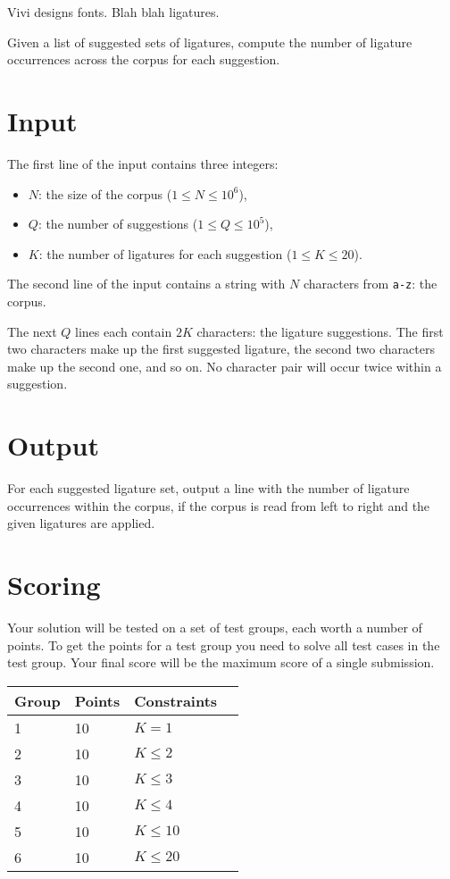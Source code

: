 Vivi designs fonts. Blah blah ligatures.

Given a list of suggested sets of ligatures, compute the number of ligature occurrences
across the corpus for each suggestion.

\section*{Input}
The first line of the input contains three integers:
\begin{itemize}
  \item $N$: the size of the corpus ($1 \le N \le 10^6$),
  \item $Q$: the number of suggestions ($1 \le Q \le 10^5$),
  \item $K$: the number of ligatures for each suggestion ($1 \le K \le 20$).
\end{itemize}

The second line of the input contains a string with $N$ characters from \texttt{a-z}: the corpus.

The next $Q$ lines each contain $2K$ characters: the ligature suggestions.
The first two characters make up the first suggested ligature, the second two characters make up the second one, and so on.
No character pair will occur twice within a suggestion.

\section*{Output}
For each suggested ligature set, output a line with the number of ligature occurrences within the corpus,
if the corpus is read from left to right and the given ligatures are applied.

\section*{Scoring}
Your solution will be tested on a set of test groups, each worth a number of points.
To get the points for a test group you need to solve all test cases in the test group.
Your final score will be the maximum score of a single submission.

\noindent
\begin{tabular}{| l | l | l | l |}
\hline
Group & Points & Constraints \\ \hline
1     & 10     & $K = 1$ \\ \hline
2     & 10     & $K \le 2$ \\ \hline
3     & 10     & $K \le 3$ \\ \hline
4     & 10     & $K \le 4$ \\ \hline
5     & 10     & $K \le 10$ \\ \hline
6     & 10     & $K \le 20$ \\ \hline
\end{tabular}
